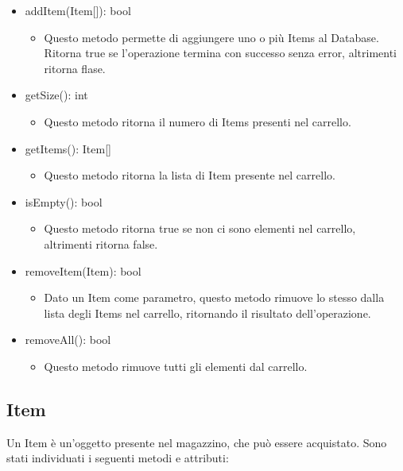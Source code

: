 \documentclass{report}
\begin{document}
\begin{itemize}
\item addItem(Item[]): bool
\begin{itemize}
	\item Questo metodo permette di aggiungere uno o più Items al Database. Ritorna true se l'operazione termina con successo senza error, altrimenti ritorna flase.
\end{itemize}

\item getSize(): int
\begin{itemize}
	\item Questo metodo ritorna il numero di Items presenti nel carrello.
\end{itemize}

\item getItems(): Item[]
\begin{itemize}
	\item Questo metodo ritorna la lista di Item presente nel carrello.
\end{itemize}

\item isEmpty(): bool
\begin{itemize}
	\item Questo metodo ritorna true se non ci sono elementi nel carrello, altrimenti ritorna false.
\end{itemize}

\item removeItem(Item): bool
\begin{itemize}
	\item Dato un Item come parametro, questo metodo rimuove lo stesso dalla lista degli Items nel carrello, ritornando il risultato dell'operazione.
\end{itemize}

\item removeAll(): bool
\begin{itemize}
	\item Questo metodo rimuove tutti gli elementi dal carrello.
\end{itemize}


\end{itemize}


\subsection*{Item}
Un Item è un'oggetto presente nel magazzino, che può essere acquistato. Sono stati individuati i seguenti metodi e attributi:
\end{document}
